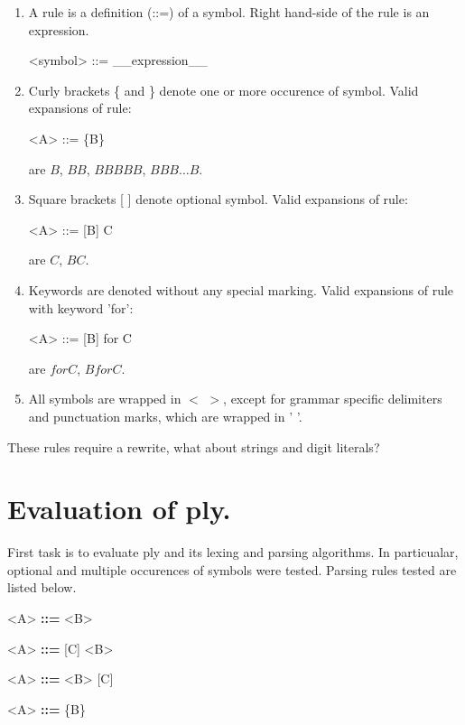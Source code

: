 \documentclass{article}
\begin{document}
\begin{enumerate}
    \item A rule is a definition (::=) of a symbol. Right hand-side of the rule is an expression.
\begin{grammar}
    <symbol> ::= __expression__
\end{grammar}
    \item Curly brackets \{ and \} denote one or more occurence of symbol.
Valid expansions of rule:
\begin{grammar}
    <A> ::= \{B\}
\end{grammar}
are $B$, $BB$, $BBBBB$, $BBB\dots B$.
    \item Square brackets [ ] denote optional symbol.
Valid expansions of rule:
\begin{grammar}
    <A> ::= [B] C
\end{grammar}
are $C$, $BC$.
    \item Keywords are denoted without any special marking.
Valid expansions of rule with keyword 'for':
\begin{grammar}
    <A> ::= [B] for C
\end{grammar}
are $for C$, $B for C$.
    \item All symbols are wrapped in $<$ $>$, except for grammar specific
    delimiters and punctuation marks, which are wrapped in ' '.
\end{enumerate}

These rules require a rewrite, what about strings and digit literals?

\section{Evaluation of ply.}
{ First task is to evaluate ply and its lexing and parsing algorithms. In particualar, optional
and multiple occurences of symbols were tested. Parsing rules tested are listed below.}

\begin{grammar}
    <A> \textbf{::=} <B>
\end{grammar}

\begin{grammar}
    <A> \textbf{::=} [C] <B>
\end{grammar}

\begin{grammar}
    <A> \textbf{::=} <B> [C]
\end{grammar}

\begin{grammar}
    <A> \textbf{::=} \{B\}
\end{grammar}
\end{document}
